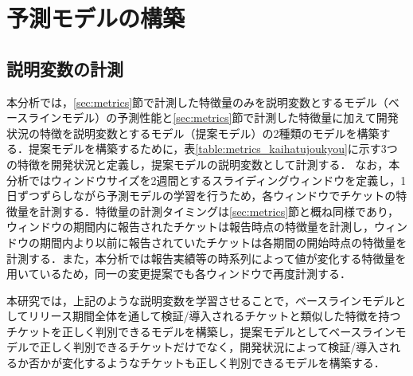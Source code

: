 \documentclass[11pt]{jreport}
\begin{document}
\section{予測モデルの構築}\label{sec:koutiku}

\subsection{説明変数の計測}\label{sec:setumeihensuu}
本分析では，\ref{sec:metrics}節で計測した特徴量のみを説明変数とするモデル（ベースラインモデル）の予測性能と\ref{sec:metrics}節で計測した特徴量に加えて開発状況の特徴を説明変数とするモデル（提案モデル）の2種類のモデルを構築する．提案モデルを構築するために，表\ref{table:metrics_kaihatujoukyou}に示す3つの特徴を開発状況と定義し，提案モデルの説明変数として計測する．
なお，本分析ではウィンドウサイズを2週間とするスライディングウィンドウを定義し，1日ずつずらしながら予測モデルの学習を行うため，各ウィンドウでチケットの特徴量を計測する．特徴量の計測タイミングは\ref{sec:metrics}節と概ね同様であり，ウィンドウの期間内に報告されたチケットは報告時点の特徴量を計測し，ウィンドウの期間内より以前に報告されていたチケットは各期間の開始時点の特徴量を計測する．また，本分析では報告実績等の時系列によって値が変化する特徴量を用いているため，同一の変更提案でも各ウィンドウで再度計測する．

本研究では，上記のような説明変数を学習させることで，ベースラインモデルとしてリリース期間全体を通して検証/導入されるチケットと類似した特徴を持つチケットを正しく判別できるモデルを構築し，提案モデルとしてベースラインモデルで正しく判別できるチケットだけでなく，開発状況によって検証/導入されるか否かが変化するようなチケットも正しく判別できるモデルを構築する．

\begin{table}[h]
  \caption{説明変数として計測する開発状況}
  \label{table:metrics_kaihatujoukyou}
  \centering
  \vspace{0.5zh}
\end{table}
\end{document}
